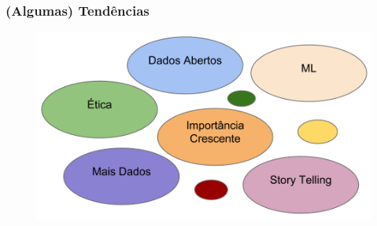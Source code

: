 \documentclass[hyperref={pdfpagelabels=true}]{beamer}
\begin{document}
\begin{frame}
\frametitle{(Algumas) Tend\^{e}ncias}

    \begin{figure}   
         \includegraphics[width=\textwidth]{trends.png}   
    \end{figure}     
    
\end{frame}
\end{document}
